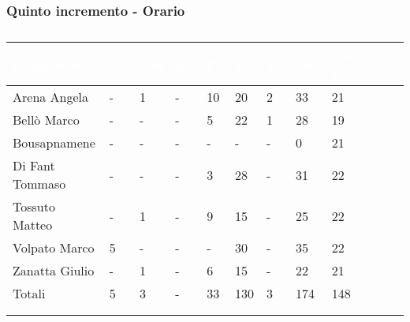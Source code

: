 {        \subsubsection{Quinto incremento - Orario} {
            \setlength{\freewidth}{\dimexpr\textwidth-30\tabcolsep}
            \renewcommand{\arraystretch}{1.0}
            \setlength{\aboverulesep}{0pt}
            \setlength{\belowrulesep}{0pt}
            \begin{longtable}{C{.3\freewidth} C{.1\freewidth} C{.1\freewidth} C{.1\freewidth} C{.1\freewidth} C{.1\freewidth} C{.1\freewidth} C{.1\freewidth} C{.1\freewidth} C{.3\freewidth}}
            \toprule
            \textcolor{white}{\textbf{Componente}}&
            \textcolor{white}{\textbf{Re}}&
            \textcolor{white}{\textbf{Am}}&
            \textcolor{white}{\textbf{An}}&
            \textcolor{white}{\textbf{Pt}}&
            \textcolor{white}{\textbf{Pr}}&
            \textcolor{white}{\textbf{Ve}}&
            \textcolor{white}{\textbf{Ore}}&
            \textcolor{white}{\textbf{Ore previste}} \\
            \toprule
            \endhead
    
            Arena Angela & - & 1 & - & 10 & 20 & 2 & 33 & 21\\      
            Bellò Marco & - & - & - & 5 & 22 & 1 & 28 & 19\\      
            Bousapnamene & - & - & - & - & - & - & 0 & 21\\      
            Di Fant Tommaso & - & - & - & 3 & 28 & - & 31 & 22\\      
            Tossuto Matteo & - & 1 & - & 9 & 15 & - & 25 & 22\\      
            Volpato Marco & 5 & - & - & - & 30 & - & 35 & 22 \\      
            Zanatta Giulio & - & 1 & - & 6 & 15 & - & 22 & 21 \\      
            Totali & 5 & 3 & - & 33 & 130 & 3 & 174 & 148 \\
            \bottomrule
            \\
            \caption{}

            \end{longtable}
             
            }

}
